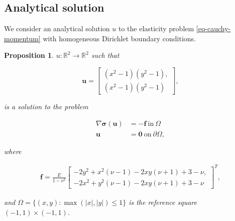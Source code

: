 \documentclass[5pt,a4paper,english]{elsarticle}%
\newtheorem{proposition}[theorem]{Proposition}
\begin{document}
\subsection{Analytical solution}


    We consider an analytical solution $u$ to the elasticity problem \eqref{eq-cauchy-momentum} with homogeneous Dirichlet boundary conditions.

\begin{proposition} \label{prop-eleastic-test-case}
    $u: \mathbb{R}^2 \rightarrow \mathbb{R}^2$ such that

    \begin{equation} \bm u =
        \begin{bmatrix}
            (x^2-1)(y^2-1), \\
            (x^2-1)(y^2-1)
        \end{bmatrix},
    \end{equation}

    is a solution to the problem

    \begin{align*}
        \nabla \bm \sigma (\bm u) &= -\bm f \ \text{in} \ \Omega \\
        \bm u &= \bm 0 \ \text{on}  \ \partial  \Omega,
    \end{align*}

    where

    \begin{align*}
        \bm f = \frac{E}{1-\nu^2}   
        \begin{bmatrix}
            -2y^2 + x^2(\nu - 1) -2xy(\nu +1) + 3 - \nu, \\
            -2x^2 + y^2(\nu - 1) -2xy(\nu +1) + 3 - \nu 
        \end{bmatrix}^T,
    \end{align*}

    and $\Omega = \{ (x,y) : \max (|x|,|y|) \leq 1 \}$ is the reference square $(-1,1) \times (-1,1)$.

\end{proposition}
\end{document}
